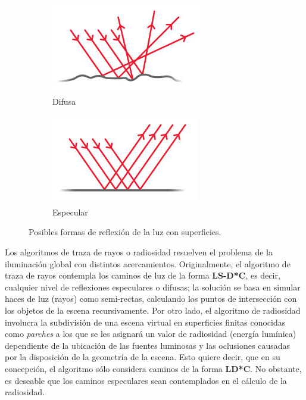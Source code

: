 \vspace{5mm}
\begin{figure}[htbp]
	\begin{subfigure}{0.5\textwidth}
		\centering
		\includegraphics[width=1\linewidth]{assets/difusa1}
		\caption{Difusa}
	\end{subfigure}
	\begin{subfigure}{0.5\textwidth}
		\centering
		\includegraphics[width=1\linewidth]{assets/especular1}
		\caption{Especular}
	\end{subfigure}
	\caption{Posibles formas de reflexión de la luz con superficies.}
	\label{img:difspecularr}
\end{figure}

Los algoritmos de traza de rayos o radiosidad resuelven el problema de la iluminación global con distintos acercamientos. Originalmente, el algoritmo de traza de rayos contempla los caminos de luz de la forma \textbf{L{S-D}*C}, es decir, cualquier nivel de reflexiones especulares o difusas; la solución se basa en simular haces de luz (rayos) como semi-rectas, calculando los puntos de intersección con los objetos de la escena recursivamente. Por otro lado, el algoritmo de radiosidad involucra la subdivisión de una escena virtual en superficies finitas conocidas como \textit{parches} a los que se les asignará un valor de radiosidad (energía lumínica) dependiente de la ubicación de las fuentes luminosas y las oclusiones causadas por la disposición de la geometría de la escena. Esto quiere decir, que en su concepción, el algoritmo sólo considera caminos de la forma \textbf{L{D}*C}. No obstante, es deseable que los caminos especulares sean contemplados en el cálculo de la radiosidad.

